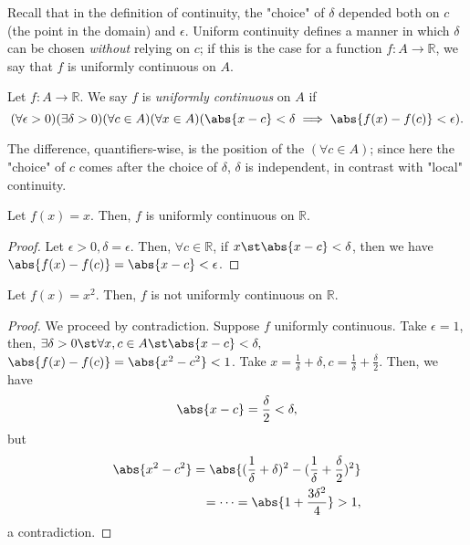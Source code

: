 \documentclass[12pt]{article}
\begin{document}
\begin{remark}
  Recall that in the definition of continuity, the "choice" of $\delta$ depended both on $c$ (the point in the domain) and $\epsilon$. Uniform continuity defines a manner in which $\delta$ can be chosen \emph{without} relying on $c$; if this is the case for a function $f : A \to \mathbb{R}$, we say that $f$ is uniformly continuous on $A$.
\end{remark}

\begin{definition}
  Let $f: A \to \mathbb{R}$. We say $f$ is \emph{uniformly continuous} on $A$ if \[
  (\forall \epsilon >0)(\exists \delta > 0)(\forall c \in A)(\forall x \in A)(\abs{x - c} < \delta \implies \abs{f(x) - f(c)} < \epsilon).
  \]
\end{definition}

\begin{remark}
  The difference, quantifiers-wise, is the position of the $(\forall c \in A)$; since here the "choice" of $c$ comes after the choice of $\delta$, $\delta$ is independent, in contrast with "local" continuity.
\end{remark}

\begin{example}
  Let $f(x) = x$. Then, $f$ is uniformly continuous on $\mathbb{R}$.
  \begin{proof}
    Let $\epsilon > 0, \delta = \epsilon$. Then, $\forall c \in \mathbb{R}$, if $x \st \abs{x - c} < \delta$, then we have $\abs{f(x) - f(c)} = \abs{x - c} < \epsilon$.
  \end{proof}
\end{example}

\begin{example}
  Let $f(x) = x^2$. Then, $f$ is not uniformly continuous on $\mathbb{R}$.
  \begin{proof}
    We proceed by contradiction. Suppose $f$ uniformly continuous. Take $\epsilon = 1$, then, $\exists \delta > 0 \st \forall x, c \in A \st \abs{x - c} < \delta,$ $\abs{f(x) - f(c)} = \abs{x^2 - c^2} < 1$. Take $x = \frac{1}{\delta} + \delta, c = \frac{1}{\delta} + \frac{\delta}{2}$. Then, we have
    \[\abs{x - c} = \frac{\delta}{2} < \delta,\]
    but
    \begin{align*}
      \abs{x^2 - c^2} = \abs{(\frac{1}{\delta} + \delta)^2 - (\frac{1}{\delta} + \frac{\delta}{2})^2}\\
      = \cdots = \abs{1 + \frac{3\delta^2}{4}} > 1,
    \end{align*}
    a contradiction. 
  \end{proof}
\end{example}
\end{document}
